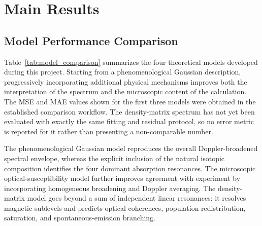 \documentclass[11pt]{article}
\numberwithin{equation}{section}
\begin{document}
\clearpage
\section{Main Results}

\subsection{Model Performance Comparison}

Table~\ref{tab:model_comparison} summarizes the four theoretical models developed during this project. Starting from a phenomenological Gaussian description, progressively incorporating additional physical mechanisms improves both the interpretation of the spectrum and the microscopic content of the calculation. The MSE and MAE values shown for the first three models were obtained in the established comparison workflow. The density-matrix spectrum has not yet been evaluated with exactly the same fitting and residual protocol, so no error metric is reported for it rather than presenting a non-comparable number.

The phenomenological Gaussian model reproduces the overall Doppler-broadened spectral envelope, whereas the explicit inclusion of the natural isotopic composition identifies the four dominant absorption resonances. The microscopic optical-susceptibility model further improves agreement with experiment by incorporating homogeneous broadening and Doppler averaging. The density-matrix model goes beyond a sum of independent linear resonances: it resolves magnetic sublevels and predicts optical coherences, population redistribution, saturation, and spontaneous-emission branching.
\end{document}
